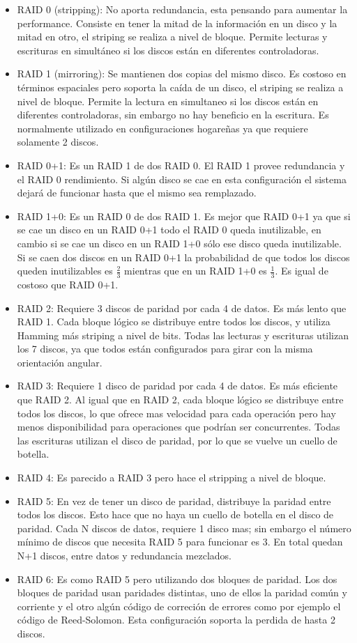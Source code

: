 \documentclass{article}
\begin{document}
\begin{itemize}
\item RAID 0 (stripping): No aporta redundancia, esta pensando para aumentar la performance. Consiste en tener la mitad de la informaci\'on en un disco y la mitad en otro, el striping se realiza a nivel de bloque. Permite lecturas y escrituras en simult\'aneo si los discos est\'an en diferentes controladoras.
\item RAID 1 (mirroring): Se mantienen dos copias del mismo disco. Es costoso en términos espaciales pero soporta la caída de un disco, el striping se realiza a nivel de bloque. Permite la lectura en simultaneo si los discos están en diferentes controladoras, sin embargo no hay beneficio en la escritura. Es normalmente utilizado en configuraciones hogareñas ya que requiere solamente 2 discos.
\item RAID 0+1: Es un RAID 1 de dos RAID 0. El RAID 1 provee redundancia y el RAID 0 rendimiento. Si algún disco se cae en esta configuración el sistema dejará de funcionar hasta que el mismo sea remplazado.
\item RAID 1+0: Es un RAID 0 de dos RAID 1. Es mejor que RAID 0+1 ya que si se cae un disco en un RAID 0+1 todo el RAID 0 queda inutilizable, en cambio si se cae un disco en un RAID 1+0 s\'olo ese disco queda inutilizable. Si se caen dos discos en un RAID 0+1 la probabilidad de que todos los discos queden inutilizables es $\frac{2}{3}$ mientras que en un RAID 1+0 es $\frac{1}{3}$. Es igual de costoso que RAID 0+1.
\item RAID 2: Requiere 3 discos de paridad por cada 4 de datos. Es m\'as lento que RAID 1. Cada bloque l\'ogico se distribuye entre todos los discos, y utiliza Hamming más striping a nivel de bits. Todas las lecturas y escrituras utilizan los 7 discos, ya que todos están configurados para girar con la misma orientación angular.
\item RAID 3: Requiere 1 disco de paridad por cada 4 de datos. Es m\'as eficiente que RAID 2. Al igual que en RAID 2, cada bloque l\'ogico se distribuye entre todos los discos, lo que ofrece mas velocidad para cada operación pero hay menos disponibilidad para operaciones que podrían ser concurrentes. Todas las escrituras utilizan el disco de paridad, por lo que se vuelve un cuello de botella.
\item RAID 4: Es parecido a RAID 3 pero hace el stripping a nivel de bloque.
\item RAID 5: En vez de tener un disco de paridad, distribuye la paridad entre todos los discos. Esto hace que no haya un cuello de botella en el disco de paridad. Cada N discos de datos, requiere 1 disco mas; sin embargo el número mínimo de discos que necesita RAID 5 para funcionar es 3. En total quedan N+1 discos, entre datos y redundancia mezclados.
\item RAID 6: Es como RAID 5 pero utilizando dos bloques de paridad. Los dos bloques de paridad usan paridades distintas, uno de ellos la paridad com\'un y corriente y el otro alg\'un c\'odigo de correci\'on de errores como por ejemplo el c\'odigo de Reed-Solomon. Esta configuración soporta la perdida de hasta 2 discos.
\end{itemize}
\end{document}
